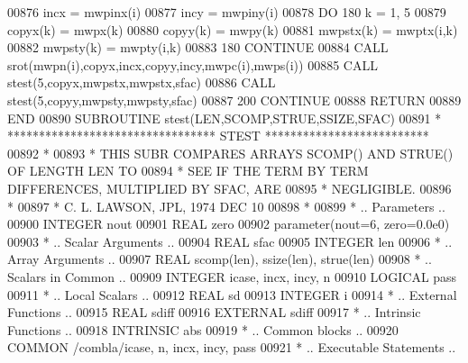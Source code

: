\begin{DoxyCode}
00876          incx = mwpinx(i)
00877          incy = mwpiny(i)
00878          \textcolor{keywordflow}{DO} 180 k = 1, 5
00879             copyx(k) = mwpx(k)
00880             copyy(k) = mwpy(k)
00881             mwpstx(k) = mwptx(i,k)
00882             mwpsty(k) = mwpty(i,k)
00883   180    \textcolor{keywordflow}{CONTINUE}
00884          \textcolor{keyword}{CALL }srot(mwpn(i),copyx,incx,copyy,incy,mwpc(i),mwps(i))
00885          \textcolor{keyword}{CALL }stest(5,copyx,mwpstx,mwpstx,sfac)
00886          \textcolor{keyword}{CALL }stest(5,copyy,mwpsty,mwpsty,sfac)
00887   200 \textcolor{keywordflow}{CONTINUE}
00888       \textcolor{keywordflow}{RETURN}
00889 \textcolor{keyword}{      END}
00890 \textcolor{keyword}{      SUBROUTINE }stest(LEN,SCOMP,STRUE,SSIZE,SFAC)
00891 \textcolor{comment}{*     ********************************* STEST **************************}
00892 \textcolor{comment}{*}
00893 \textcolor{comment}{*     THIS SUBR COMPARES ARRAYS  SCOMP() AND STRUE() OF LENGTH LEN TO}
00894 \textcolor{comment}{*     SEE IF THE TERM BY TERM DIFFERENCES, MULTIPLIED BY SFAC, ARE}
00895 \textcolor{comment}{*     NEGLIGIBLE.}
00896 \textcolor{comment}{*}
00897 \textcolor{comment}{*     C. L. LAWSON, JPL, 1974 DEC 10}
00898 \textcolor{comment}{*}
00899 \textcolor{comment}{*     .. Parameters ..}
00900       \textcolor{keywordtype}{INTEGER}          nout
00901       \textcolor{keywordtype}{REAL}             zero
00902       parameter(nout=6, zero=0.0e0)
00903 \textcolor{comment}{*     .. Scalar Arguments ..}
00904       \textcolor{keywordtype}{REAL}             sfac
00905       \textcolor{keywordtype}{INTEGER}          len
00906 \textcolor{comment}{*     .. Array Arguments ..}
00907       \textcolor{keywordtype}{REAL}             scomp(len), ssize(len), strue(len)
00908 \textcolor{comment}{*     .. Scalars in Common ..}
00909       \textcolor{keywordtype}{INTEGER}          icase, incx, incy, n
00910       \textcolor{keywordtype}{LOGICAL}          pass
00911 \textcolor{comment}{*     .. Local Scalars ..}
00912       \textcolor{keywordtype}{REAL}             sd
00913       \textcolor{keywordtype}{INTEGER}          i
00914 \textcolor{comment}{*     .. External Functions ..}
00915       \textcolor{keywordtype}{REAL}             sdiff
00916       \textcolor{keywordtype}{EXTERNAL}         sdiff
00917 \textcolor{comment}{*     .. Intrinsic Functions ..}
00918       \textcolor{keywordtype}{INTRINSIC}        abs
00919 \textcolor{comment}{*     .. Common blocks ..}
00920       \textcolor{keyword}{COMMON}           /combla/icase, n, incx, incy, pass
00921 \textcolor{comment}{*     .. Executable Statements ..}

\end{DoxyCode}
